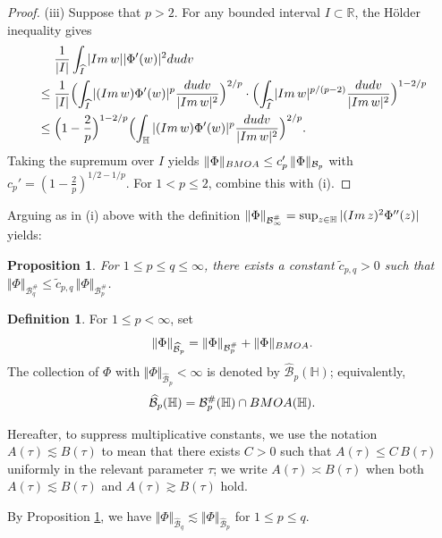 \documentclass[amstex,12pt,reqno]{amsart}
\newtheorem{proposition}[theorem]{Proposition}
\theoremstyle{definition}
\newtheorem{definition}{Definition}
\begin{document}
\begin{proof}
(iii) Suppose that $p>2$. For any bounded interval $I\subset\mathbb R$,
the H\"older inequality gives
\begin{align}
&\quad\ \frac{1}{|I|}\int_{\widehat I}|{\rm Im}\,w||\Phi'(w)|^2dudv\\ 
&\leq
\frac{1}{|I|}\Bigl(\int_{\widehat I}|({\rm Im}\,w)\Phi'(w)|^p\frac{dudv}{|{\rm Im}\,w|^2} \Bigr)^{2/p} \cdot
\Bigl(\int_{\widehat I} |{\rm Im}\,w|^{p/(p-2)}\frac{dudv}{|{\rm Im}\,w|^2}\Bigr)^{1-2/p}\\
&\leq \Bigl(1-\frac{2}{p} \Bigr)^{1-2/p}
\Bigl(\int_{\mathbb H}|({\rm Im}\,w)\Phi'(w)|^p\frac{dudv}{|{\rm Im}\,w|^2} \Bigr)^{2/p}.
\end{align}
Taking the supremum over $I$ yields $\Vert \Phi \Vert_{\rm BMOA} \leq c'_p\,\Vert \Phi \Vert_{{\mathcal B}_p}$ with 
$c_p'=(1-\frac{2}{p})^{1/2-1/p}$. For $1<p \leq 2$, combine this with (i).
\end{proof}

Arguing as in (i) above with the definition
$\Vert \Phi \Vert_{{\mathcal B}_{\infty}^{\#}}=\sup_{z \in \mathbb H}|({\rm Im}\,z)^2\Phi''(z)|$
yields:

\begin{proposition}\label{norm2}
For $1 \leq p \leq q \leq \infty$, 
there exists a constant $\tilde c_{p,q}>0$ such that
$\Vert \Phi\Vert_{{\mathcal B}_q^{\#}} \leq \tilde c_{p,q}\,\Vert \Phi\Vert_{{\mathcal B}_p^{\#}}$.
\end{proposition}

\begin{definition}
For $1 \leq p <\infty$, set
$$
\Vert \Phi \Vert_{\widehat{\mathcal B}_p}=\Vert \Phi \Vert_{{\mathcal B}_p^{\#}}+\Vert \Phi\Vert_{\rm BMOA}.
$$
The collection of $\Phi$ with 
$\Vert \Phi\Vert_{\widehat{\mathcal B}_p}<\infty$
is denoted by $\widehat{\mathcal B}_p(\mathbb H)$; equivalently,
$$
\widehat{\mathcal B}_p(\mathbb H)={\mathcal B}_p^{\#}(\mathbb H) \cap {\rm BMOA}(\mathbb H).
$$
\end{definition}

Hereafter, to suppress multiplicative constants, we use the notation
$A(\tau) \lesssim B(\tau)$ to mean that there exists $C>0$
such that $A(\tau) \leq C\,B(\tau)$ uniformly in the relevant parameter $\tau$;
we write $A(\tau) \asymp B(\tau)$ when both $A(\tau) \lesssim B(\tau)$ and $A(\tau) \gtrsim B(\tau)$ hold.

By Proposition \ref{norm2}, we have 
$\Vert \Phi \Vert_{\widehat{\mathcal B}_q} \lesssim \Vert \Phi \Vert_{\widehat{\mathcal B}_p}$
for $1 \leq p \leq q$. 
\end{document}
